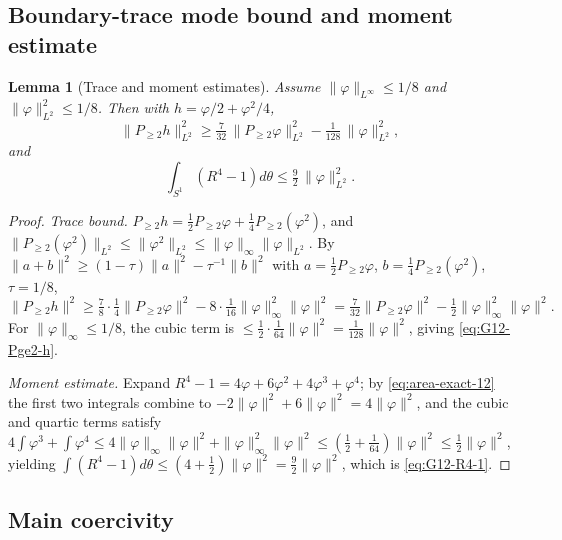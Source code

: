 \documentclass[11pt]{amsart}
\newtheorem{lemma}[theorem]{Lemma}
\begin{document}
\subsection{Boundary-trace mode bound and moment estimate}
\label{ss:G12-trace}

\begin{lemma}[Trace and moment estimates]\label{lem:G12-trace}
Assume \(\|\varphi\|_{L^\infty}\le 1/8\) and
\(\|\varphi\|_{L^2}^2\le 1/8\).  Then with
\(h=\varphi/2+\varphi^2/4\),
\begin{equation}\label{eq:G12-Pge2-h}
   \|P_{\ge 2}h\|_{L^2}^2
     \ge\tfrac{7}{32}\,\|P_{\ge 2}\varphi\|_{L^2}^2
       -\tfrac{1}{128}\,\|\varphi\|_{L^2}^2 ,
\end{equation}
and
\begin{equation}\label{eq:G12-R4-1}
   \int_{S^1}(R^4-1)d\theta
     \le \tfrac{9}{2}\,\|\varphi\|_{L^2}^2 .
\end{equation}
\end{lemma}

\begin{proof}
\emph{Trace bound.}  \(P_{\ge 2}h
=\tfrac12 P_{\ge 2}\varphi+\tfrac14 P_{\ge 2}(\varphi^2)\), and
\(\|P_{\ge 2}(\varphi^2)\|_{L^2}\le\|\varphi^2\|_{L^2}
\le\|\varphi\|_\infty\|\varphi\|_{L^2}\).  By
\(\|a+b\|^2\ge(1-\tau)\|a\|^2-\tau^{-1}\|b\|^2\) with
\(a=\tfrac12 P_{\ge 2}\varphi\), \(b=\tfrac14 P_{\ge 2}(\varphi^2)\),
\(\tau=1/8\),
\[
   \|P_{\ge 2}h\|^2
     \ge\tfrac{7}{8}\cdot\tfrac14\|P_{\ge 2}\varphi\|^2
       -8\cdot\tfrac{1}{16}\|\varphi\|_\infty^2\|\varphi\|^2
     =\tfrac{7}{32}\|P_{\ge 2}\varphi\|^2
       -\tfrac12\|\varphi\|_\infty^2\|\varphi\|^2 .
\]
For \(\|\varphi\|_\infty\le 1/8\), the cubic term is
\(\le\tfrac12\cdot\tfrac{1}{64}\|\varphi\|^2
=\tfrac{1}{128}\|\varphi\|^2\), giving \eqref{eq:G12-Pge2-h}.

\emph{Moment estimate.}  Expand
\(R^4-1=4\varphi+6\varphi^2+4\varphi^3+\varphi^4\); by
\eqref{eq:area-exact-12} the first two integrals combine to
\(-2\|\varphi\|^2+6\|\varphi\|^2=4\|\varphi\|^2\), and the cubic and
quartic terms satisfy
\(4\int\varphi^3+\int\varphi^4
\le 4\|\varphi\|_\infty\|\varphi\|^2+\|\varphi\|_\infty^2\|\varphi\|^2
\le(\tfrac12+\tfrac{1}{64})\|\varphi\|^2\le\tfrac{1}{2}\|\varphi\|^2\),
yielding
\(\int(R^4-1)d\theta\le(4+\tfrac12)\|\varphi\|^2
=\tfrac{9}{2}\|\varphi\|^2\), which is \eqref{eq:G12-R4-1}.
\end{proof}

\subsection{Main coercivity}
\label{ss:G12-main}
\end{document}

